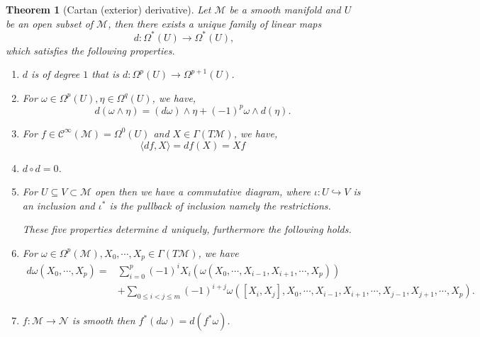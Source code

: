 \documentclass[8pt]{article}
\newcommand\comsymb[2][\circlearrowleft]{%
  \arrow[mysymbol]{#2}[description]{#1}}
\newtheorem{theorem}{Theorem} [section]
\newcommand{\M}[0]{\mathcal{M}}
\newcommand{\maniN}[0]{\mathcal{N}}
\newcommand{\cinf}[0]{\mathcal{C}^\infty}
\begin{document}
\begin{theorem}[Cartan (exterior) derivative]
  \label{theorem_12_7}
  Let $\M$ be a smooth manifold and $U$ be an open subset of $\M$, then there exists a unique family of linear maps 
  \begin{equation*}
    d:\Omega^*(U)\to\Omega^*(U),
  \end{equation*}
  which satisfies the following properties.
  \begin{enumerate}[1).]
    \item $d$ is of degree $1$ that is $d:\Omega^p(U)\to\Omega^{p+1}(U)$.
    \item For $\omega\in\Omega^p(U),\eta\in\Omega^{q}(U)$, we have, 
      \begin{equation*}
        d(\omega\wedge\eta) = (d\omega)\wedge\eta+(-1)^p\omega\wedge d(\eta).
      \end{equation*}
    \item For $f\in\cinf(\M)=\Omega^0(U)$ and $X\in\Gamma(T\M)$, we have,
    \begin{equation*}
      \langle df,X\rangle = df(X) = Xf
    \end{equation*}
    \item $d\circ d = 0$.
    \item For $U\subseteq V\subset\M$ open then we have a commutative diagram, where $\iota:U\hookrightarrow V$ is an inclusion and $\iota^*$ is the pullback of inclusion namely the restrictions.
    \begin{center}
    \end{center}
    These five properties determine $d$ uniquely, furthermore the following holds.
    \item For $\omega\in\Omega^p(\M),X_0,\cdots,X_p\in\Gamma(T\M)$, we have
    \begin{align*}
      d\omega(X_0,\cdots,X_p) =& \sum_{i=0}^p(-1)^iX_i(\omega(X_0,\cdots,X_{i-1},X_{i+1},\cdots,X_p))\\
       & + \sum_{0\leq i<j\leq m}(-1)^{i+j}\omega([X_i,X_j],X_0,\cdots,X_{i-1},X_{i+1},\cdots,X_{j-1},X_{j+1},\cdots,X_p).
    \end{align*}
  \item $f:\M\to\maniN$ is smooth then $f^*(d\omega) = d(f^*\omega)$.
  \end{enumerate}
\end{theorem}
\end{document}
